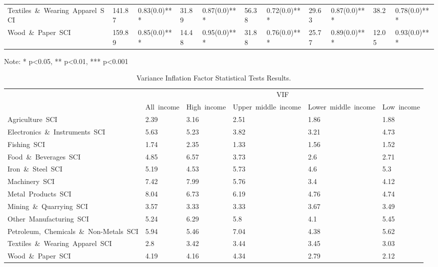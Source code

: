 \documentclass[10pt]{article}
\begin{document}
\begin{table}
\begin{adjustbox}{width=\textwidth,center}
\begin{tabular}{lllllllllll}
      Textiles\ \&\ Wearing\ Apparel\ SCI & 141.87 & 0.83(0.0)*** & 31.89 & 0.87(0.0)*** & 56.38 & 0.72(0.0)*** & 29.63 & 0.87(0.0)*** & 38.2 & 0.78(0.0)*** \\
      Wood\ \&\ Paper\ SCI & 159.89 & 0.85(0.0)*** & 14.48 & 0.95(0.0)*** & 31.88 & 0.76(0.0)*** & 25.77 & 0.89(0.0)*** & 12.05 & 0.93(0.0)*** \\
      \bottomrule
      \end{tabular}
\end{adjustbox}
{\centering\tiny Note: * p\textless0.05, ** p\textless0.01, *** p\textless0.001\par}
\hfill
\end{table}


\begin{table}
	\centering
	\caption{Variance Inflation Factor Statistical Tests Results.}
      \label{tab:vif-test} 
\begin{adjustbox}{width=\textwidth,center}
      \begin{tabular}{llllll}
      \toprule
      & \multicolumn{5}{c}{VIF} \\
      & All\ income & High\ income & Upper\ middle\ income & Lower\ middle\ income & Low\ income \\
      \midrule
      Agriculture\ SCI & 2.39 & 3.16 & 2.51 & 1.86 & 1.88 \\
      Electronics\ \&\ Instruments\ SCI & 5.63 & 5.23 & 3.82 & 3.21 & 4.73 \\
      Fishing\ SCI & 1.74 & 2.35 & 1.33 & 1.56 & 1.52 \\
      Food\ \&\ Beverages\ SCI & 4.85 & 6.57 & 3.73 & 2.6 & 2.71 \\
      Iron\ \&\ Steel\ SCI & 5.19 & 4.53 & 5.73 & 4.6 & 5.3 \\
      Machinery\ SCI & 7.42 & 7.99 & 5.76 & 3.4 & 4.12 \\
      Metal\ Products\ SCI & 8.04 & 6.73 & 6.19 & 4.76 & 4.74 \\
      Mining\ \&\ Quarrying\ SCI & 3.57 & 3.33 & 3.33 & 3.67 & 3.49 \\
      Other\ Manufacturing\ SCI & 5.24 & 6.29 & 5.8 & 4.1 & 5.45 \\
      Petroleum,\ Chemicals\ \&\ Non-Metals\ SCI & 5.94 & 5.46 & 7.04 & 4.38 & 5.62 \\
      Textiles\ \&\ Wearing\ Apparel\ SCI & 2.8 & 3.42 & 3.44 & 3.45 & 3.03 \\
      Wood\ \&\ Paper\ SCI & 4.19 & 4.16 & 4.34 & 2.79 & 2.12 \\

\end{tabular}
\end{adjustbox}
\end{table}
\end{document}
